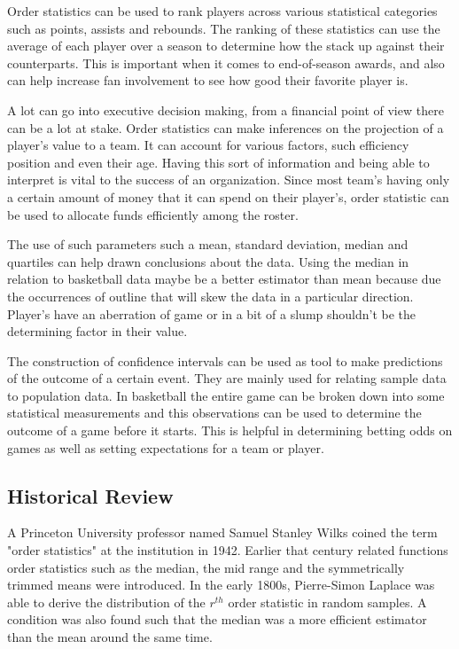\documentclass[11pt,a4paper]{article}
\theoremstyle{plain}
\begin{document}
Order statistics can be used to rank players across various statistical categories such as points, assists and rebounds. The ranking of these statistics can use the average of each player over a season to determine how the stack up against their counterparts. This is important when it comes to end-of-season awards, and also can help increase fan involvement to see how good their favorite player is.


A lot can go into executive decision making, from a financial point of view there can be a lot at stake. Order statistics can make inferences on the projection of a player's value to a team. It can account for various factors, such efficiency position and even their age. Having this sort of information and being able to interpret is vital to the success of an organization. Since most team's having only a certain amount of money that it can spend on their player's, order statistic can be used to allocate funds efficiently among the roster.


The use of such parameters such a mean, standard deviation, median and quartiles can help drawn conclusions about the data. Using the median in relation to basketball data maybe be a better estimator than mean because due the occurrences of outline that will skew the data in a particular direction. Player's have an aberration of game or in a bit of a slump shouldn't be the determining factor in their value. 

The construction of confidence intervals can be used as tool to make predictions of the outcome of a certain event. They are mainly used for relating sample data to population data. In basketball the entire game can be broken down into some statistical measurements and this observations can be used to determine the outcome of a game before it starts. This is helpful in determining betting odds on games as well as setting expectations for a team or player. 



\newpage
\subsection{Historical Review}
A Princeton University professor named Samuel Stanley Wilks coined the term "order statistics" at the institution in 1942. Earlier that century related functions order statistics such as the median, the mid range and the symmetrically trimmed means were introduced. In the early 1800s, Pierre-Simon Laplace was able to derive the distribution of the $r^{th}$ order statistic in random samples. A condition was also found such that the median was a more efficient estimator than the mean around the same time. 
\end{document}
